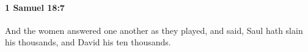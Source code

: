 
		\paragraph{1 Samuel 18:7} %
			\label{1SAMUEL-18-7}

			And the women answered one another as they played, and said, Saul hath slain his thousands, and David his ten thousands.


